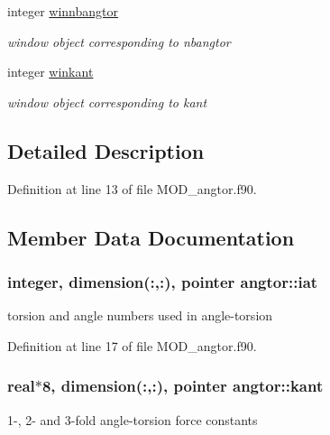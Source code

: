 \begin{DoxyCompactItemize}
integer \hyperlink{classangtor_a31db7ffa69fe06e6bd00f7ea4cccf43c}{winnbangtor}
\begin{DoxyCompactList}\small\item\em window object corresponding to nbangtor \end{DoxyCompactList}\item 
integer \hyperlink{classangtor_ad7a8d546e4362617e885cbf94df68b73}{winkant}
\begin{DoxyCompactList}\small\item\em window object corresponding to kant \end{DoxyCompactList}\end{DoxyCompactItemize}


\subsection{Detailed Description}


Definition at line 13 of file M\-O\-D\-\_\-angtor.\-f90.



\subsection{Member Data Documentation}
\hypertarget{classangtor_ae80a65c59331cc568ca3967bd8c70d7c}{
\subsubsection[{iat}]{\setlength{\rightskip}{0pt plus 5cm}integer, dimension(\-:,\-:), pointer angtor\-::iat}}\label{classangtor_ae80a65c59331cc568ca3967bd8c70d7c}


torsion and angle numbers used in angle-\/torsion 



Definition at line 17 of file M\-O\-D\-\_\-angtor.\-f90.

\hypertarget{classangtor_ab85a39f9262c8621278d6999a6c1bcc6}{
\subsubsection[{kant}]{\setlength{\rightskip}{0pt plus 5cm}real$\ast$8, dimension(\-:,\-:), pointer angtor\-::kant}}\label{classangtor_ab85a39f9262c8621278d6999a6c1bcc6}


1-\/, 2-\/ and 3-\/fold angle-\/torsion force constants 



